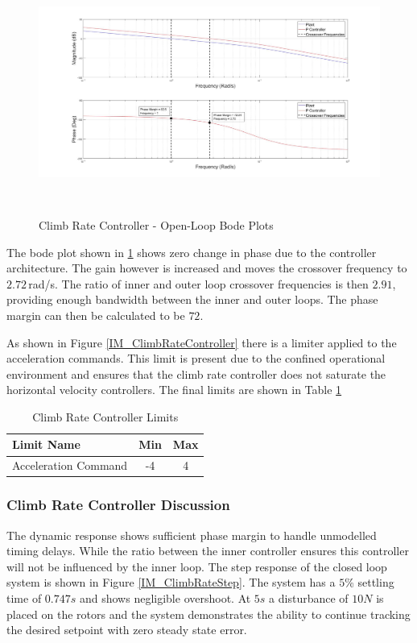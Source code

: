 	 \begin{figure}[H]
	 	\centering
	 	\includegraphics[height = 8cm]{../Design/Matlab/Controllers/climb_rate_bode.jpg}
	 	\caption{Climb Rate Controller - Open-Loop Bode Plots}
	 	\label{IM_ClimbRateBode}
	 \end{figure}
	 
	 The bode plot shown in \ref{IM_ClimbRateBode} shows zero change in phase due to the controller architecture. The gain however is increased and moves the crossover frequency to $2.72$\,rad/s. The ratio of inner and outer loop crossover frequencies is then $2.91$, providing enough bandwidth between the inner and outer loops. The phase margin can then be calculated to be $72$\textdegree. 
	 
	 As shown in Figure \ref{IM_ClimbRateController} there is a limiter applied to the acceleration commands. This limit is present due to the confined operational environment and ensures that the climb rate controller does not saturate the horizontal velocity controllers. The final limits are shown in Table \ref{tab:ClimbrateLimits}
	 
	 \begin{table}[!]
	 	\centering
	 	\begin{tabular}{l | c | c |}
	 		Limit Name 						& Min & Max\\
	 		\hline\hline
	 		Acceleration Command 		    & -4 & 4 \\
	 	\end{tabular}
	 	\caption{Climb Rate Controller Limits}
	 	\label{tab:ClimbrateLimits}
	 \end{table}
	 
		 \subsubsection{Climb Rate Controller Discussion}
		 The dynamic response shows sufficient phase margin to handle unmodelled timing delays. While the ratio between the inner controller ensures this controller will not be influenced by the inner loop. The step response of the closed loop system is shown in Figure \ref{IM_ClimbRateStep}. The system has a $5$\% settling time of $0.747s$ and shows negligible overshoot. At $5s$ a disturbance of $10N$ is placed on the rotors and the system demonstrates the ability to continue tracking the desired setpoint with zero steady state error. 
		 
